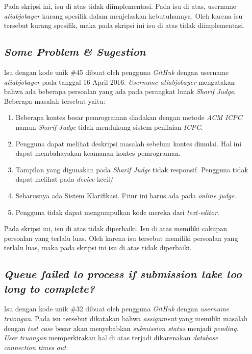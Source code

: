 Pada skripsi ini, isu di atas tidak diimplementasi. Pada isu di atas, username \textit{atiabjobayer} kurang spesifik dalam menjelaskan kebutuhannya.
Oleh karena isu tersebut kurang spesifik, maka pada skripsi ini isu di atas tidak diimplementasi.

\subsection{\textit{Some Problem \& Sugestion}}
Isu dengan kode unik \#45 dibuat oleh pengguna \textit{GitHub} dengan username \textit{atiabjobayer} pada tanggal 16 April 2016. \textit{Username} \textit{atiabjobayer} mengatakan bahwa ada beberapa persoalan yang ada pada perangkat lunak \textit{Sharif Judge}. Beberapa masalah tersebut yaitu:
	\begin{enumerate}
		\item Beberapa kontes besar pemrograman diadakan dengan metode \textit{ACM ICPC} namun \textit{Sharif Judge} tidak mendukung sistem penilaian \textit{ICPC}.
		\item Pengguna dapat melihat deskripsi masalah sebelum kontes dimulai. Hal ini dapat membahayakan keamanan kontes pemrograman.
		\item Tampilan yang digunakan pada \textit{Sharif Judge} tidak responsif. Pengguna tidak dapat melihat pada \textit{device} kecil/
		\item Seharusnya ada Sistem Klarifikasi. Fitur ini harus ada pada \textit{online judge}.
		\item Pengguna tidak dapat mengumpulkan kode mereka dari \textit{text-editor}.
	\end{enumerate}

Pada skripsi ini, isu di atas tidak diperbaiki. Isu di atas memiliki cakupan persoalan yang terlalu luas. Oleh karena isu tersebut memiliki persoalan yang terlalu luas, maka pada skripsi ini isu di atas tidak diperbaiki.
	
\subsection{\textit{Queue failed to process if submission take too long to complete?}}
Isu dengan kode unik \#32 dibuat oleh pengguna \textit{GitHub} dengan \textit{username} \textit{truongan}. Pada isu tersebut dikatakan bahwa \textit{assignment} yang memiliki masalah dengan \textit{test case} besar akan menyebabkan \textit{submission status} menjadi \textit{pending}. \textit{User} \textit{truongan} memperkirakan hal di atas terjadi dikarenakan \textit{database connection times out}. 

